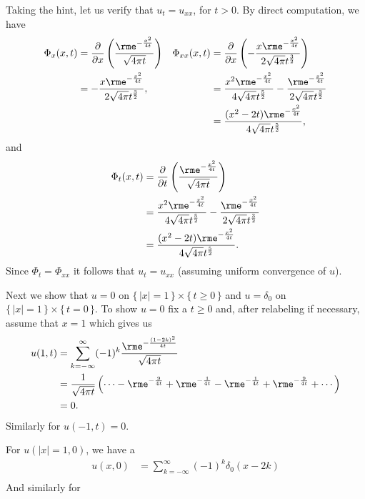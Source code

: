 \begin{solution}
  Taking the hint, let us verify that \(u_t=u_{xx}\), for \(t>0\). By
  direct computation, we have
  \begin{align*}
    \Phi_x(x,t)
    &=\frac{\partial}{\partial x}
      \left(\frac{\rme^{-\frac{x^2}{4t}}}{\sqrt{4\pi t}}\right)
    &\Phi_{xx}(x,t)
    &=\frac{\partial}{\partial x}
      \left(-\frac{x\rme^{-\frac{x^2}{4t}}}{2\sqrt{4\pi}t^{\frac{3}{2}}}\right)\\
    &=-\frac{x\rme^{-\frac{x^2}{4t}}}{2\sqrt{4\pi}t^{\frac{3}{2}}},
    &&=\frac{x^2\rme^{-\frac{x^2}{4t}}}{4\sqrt{4\pi}t^{\frac{5}{2}}}
      -\frac{\rme^{-\frac{x^2}{4t}}}{2\sqrt{4\pi}t^{\frac{3}{2}}}
    \\
    &&&=\frac{(x^2-2t)\rme^{-\frac{x^2}{4t}}}{4\sqrt{4\pi}t^{\frac{5}{2}}},
  \end{align*}
  and
  \begin{align*}
    \Phi_t(x,t)
    &=\frac{\partial}{\partial t}
      \left(\frac{\rme^{-\frac{x^2}{4t}}}{\sqrt{4\pi t}}\right)\\
    &=\frac{x^2\rme^{-\frac{x^2}{4t}}}{4\sqrt{4\pi}t^{\frac{5}{2}}}
      -\frac{\rme^{-\frac{x^2}{4t}}}{2\sqrt{4\pi}t^{\frac{3}{2}}}\\
    &=\frac{(x^2-2t)\rme^{-\frac{x^2}{4t}}}{4\sqrt{4\pi}t^{\frac{5}{2}}}.
  \end{align*}
  Since \(\Phi_t=\Phi_{xx}\) it follows that \(u_t=u_{xx}\) (assuming
  uniform convergence of \(u\)).

  Next we show that \(u=0\) on \(\{\,|x|=1\,\}\times\{\,t\geq 0\,\}\) and
  \(u=\delta_0\) on \(\{\,|x|=1\,\}\times\{\,t=0\,\}\). To show \(u=0\) fix
  a \(t\geq 0\) and, after relabeling if necessary, assume that \(x=1\)
  which gives us
  \begin{align*}
    u(1,t)
    &=\sum_{k=-\infty}^\infty(-1)^k\frac{\rme^{-\frac{(1-2k)^2}{4t}}}{\sqrt{4\pi
      t}}\\
    &=\frac{1}{\sqrt{4\pi t}}%
      \left(\dotsb-\rme^{-\frac{9}{4t}}%
      +\rme^{-\frac{1}{4t}}-\rme^{-\frac{1}{4t}}%
      +\rme^{-\frac{9}{4t}}+\dotsb\right)\\
    &=0.
  \end{align*}
  Similarly for \(u(-1,t)=0\).

  For \(u(|x|=1,0)\), we have a
  \begin{align*}
    u(x,0)
    &=\sum_{k=-\infty}^\infty(-1)^k\delta_0(x-2k)\\
  \end{align*}
  And similarly for
\end{solution}
\newpage

